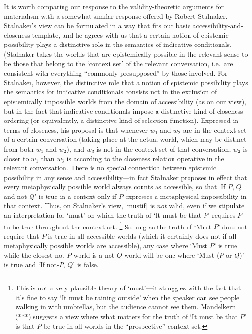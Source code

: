 \documentclass[If.tex]{subfiles}
\begin{document}
It is worth comparing our response to the validity-theoretic arguments for materialism with a somewhat similar response offered by Robert Stalnaker.  Stalnaker's view can be formulated in a way that fits our basic accessibility-and-closeness template, and he agrees with us that a certain notion of epistemic possibility plays a distinctive role in the semantics of indicative conditionals.  (Stalnaker takes the worlds that are epistemically possible in the relevant sense to be those that belong to the ‘context set’ of the relevant conversation, i.e.\ are consistent with everything “commonly presupposed” by those involved.  For Stalnaker, however, the distinctive role that a notion of epistemic possibility plays the semantics for indicative conditionals consists not in the exclusion of epistemically impossible worlds from the domain of accessibility (as on our view), but in the fact that indicative conditionals impose a distinctive kind of closeness ordering (or equivalently, a distinctive kind of selection function).   Expressed in terms of closeness, his proposal is that whenever $w_1$ and $w_2$ are in the context set of a certain conversation (taking place at the actual world, which may be distinct from both $w_1$ and $w_2$), and $w_3$ is not in the context set of that conversation, $w_2$ is closer to $w_1$ than $w_3$ is according to the closeness relation operative in the relevant conversation.  There is no special connection between epistemic possibility in any sense and accessibility---in fact Stalnaker proposes in effect that every metaphysically possible world always counts as accessible, so that ‘If $P$, $Q$ and not $Q$’ is true in a context only if $P$ expresses a metaphysical impossibility in that context.  Thus, on Stalnaker's view, \ref{mustif} is \emph{not} valid, even if we stipulate an interpretation for ‘must’ on which the truth of ‘It must be that $P$’ requires $P$ to be true throughout the context set.%
\footnote{This is not a very plausible theory of ‘must’---it struggles with the fact that it's fine to say ‘It must be raining outside’ when the speaker can see people walking in with umbrellas, but the audience cannot see them.  Mandelkern (***) suggests a view where what matters for the truth of ‘It must be that $P$’ is that $P$ be true in all worlds in the “prospective” context set.}  
So long as the truth of ‘Must $P$’ does not require that $P$ is true in all accessible worlds (which it certainly does not if all metaphysically possible worlds are accessible), any case where ‘Must $P$’ is true while the closest not-$P$ world is a not-$Q$ world will be one where ‘Must ($P$ or $Q$)’ is true and ‘If not-$P$, $Q$’ is false.
\end{document}
